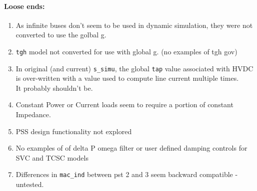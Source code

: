 \documentclass[12pt]{article}
\begin{document}
\begin{multicols}{2}
\paragraph{Loose ends:} %
	\begin{enumerate}
	\item As infinite buses don't seem to be used in dynamic simulation, they were not converted to use the golbal g.
		\item \verb|tgh| model not converted for use with global g. (no examples of tgh gov)
		\item In original (and current) \verb|s_simu|, the global \verb|tap| value associated with HVDC is over-written with  a value used to compute line current multiple times. \\It probably shouldn't be.
		\item Constant Power or Current loads seem to require a portion of constant Impedance.
		\item PSS design functionality not explored
		\item No examples of of delta P omega filter or user defined damping controls for SVC and TCSC models
		\item Differences in \verb|mac_ind| between pst 2 and 3 seem backward compatible - untested.
	\end{enumerate}
\vfill\null

\end{multicols}
\end{document}
